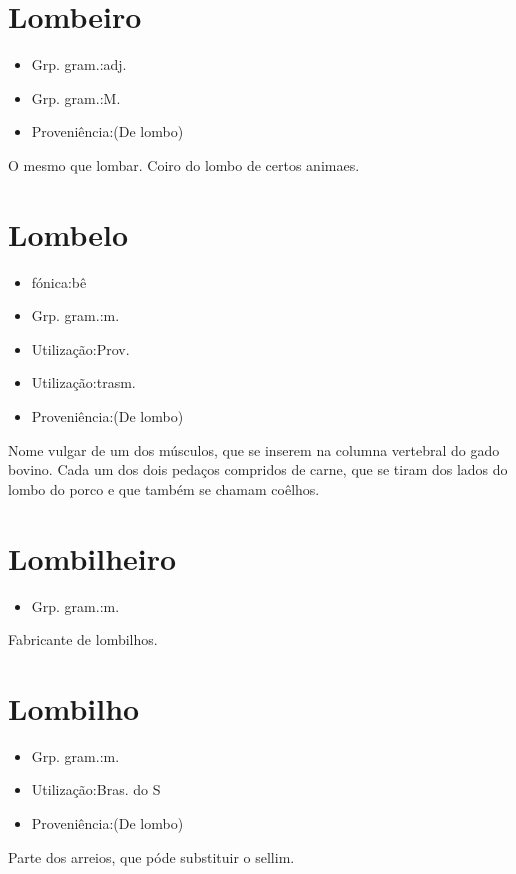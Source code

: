 \section{Lombeiro}
\begin{itemize}
\item {Grp. gram.:adj.}
\end{itemize}
\begin{itemize}
\item {Grp. gram.:M.}
\end{itemize}
\begin{itemize}
\item {Proveniência:(De \textunderscore lombo\textunderscore )}
\end{itemize}
O mesmo que \textunderscore lombar\textunderscore .
Coiro do lombo de certos animaes.
\section{Lombelo}
\begin{itemize}
\item {fónica:bê}
\end{itemize}
\begin{itemize}
\item {Grp. gram.:m.}
\end{itemize}
\begin{itemize}
\item {Utilização:Prov.}
\end{itemize}
\begin{itemize}
\item {Utilização:trasm.}
\end{itemize}
\begin{itemize}
\item {Proveniência:(De \textunderscore lombo\textunderscore )}
\end{itemize}
Nome vulgar de um dos músculos, que se inserem na columna vertebral do gado bovino.
Cada um dos dois pedaços compridos de carne, que se tiram dos lados do lombo do porco e que também se chamam coêlhos.
\section{Lombilheiro}
\begin{itemize}
\item {Grp. gram.:m.}
\end{itemize}
Fabricante de lombilhos.
\section{Lombilho}
\begin{itemize}
\item {Grp. gram.:m.}
\end{itemize}
\begin{itemize}
\item {Utilização:Bras. do S}
\end{itemize}
\begin{itemize}
\item {Proveniência:(De \textunderscore lombo\textunderscore )}
\end{itemize}
Parte dos arreios, que póde substituir o sellim.
